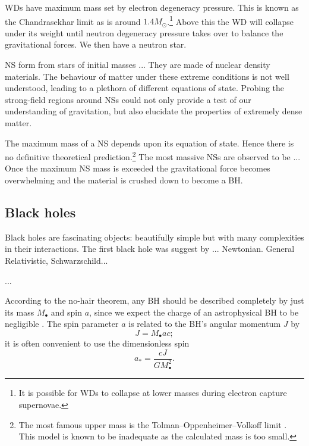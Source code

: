WDs have maximum mass set by electron degeneracy pressure. This is known as the Chandrasekhar limit as is around $1.4 M_\odot$.\footnote{It is possible for WDs to collapse at lower masses during electron capture supernovae.} Above this the WD will collapse under its weight until neutron degeneracy pressure takes over to balance the gravitational forces. We then have a neutron star.

NS form from stars of initial masses ... They are made of nuclear density materials. The behaviour of matter under these extreme conditions is not well understood, leading to a plethora of different equations of state. Probing the strong-field regions around NSs could not only provide a test of our understanding of gravitation, but also elucidate the properties of extremely dense matter.

The maximum mass of a NS depends upon its equation of state. Hence there is no definitive theoretical prediction.\footnote{The most famous upper mass is the Tolman--Oppenheimer--Volkoff limit \citep{Tolman1939,Oppenheimer1939}. This model is known to be inadequate as the calculated mass is too small.} The most massive NSs are observed to be ... Once the maximum NS mass is exceeded the gravitational force becomes overwhelming and the material is crushed down to become a BH.

\subsection{Black holes}

Black holes are fascinating objects: beautifully simple but with many complexities in their interactions. The first black hole was suggest by ... Newtonian. General Relativistic, Schwarzschild...

...

According to the no-hair theorem, any BH should be described completely by just its mass $M_\bullet$ and spin $a$, since we expect the charge of an astrophysical BH to be negligible \citep{Israel1967, Israel1968, Carter1971, Hawking1972, Robinson1975, Chandrasekhar1992}. The spin parameter $a$ is related to the BH's angular momentum $J$ by
\begin{equation}
J = M_\bullet ac;
\end{equation}
it is often convenient to use the dimensionless spin
\begin{equation}
a_\ast = \frac{cJ}{GM_\bullet^2}.
\end{equation}


